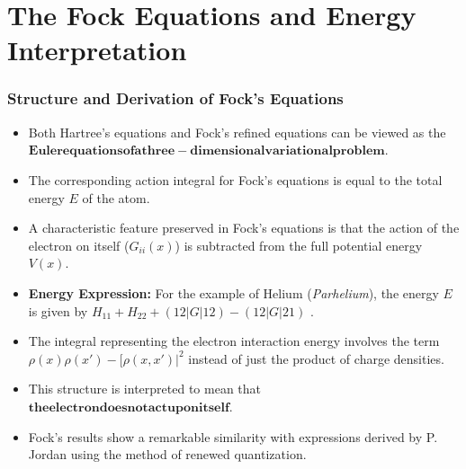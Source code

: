 \section{The Fock Equations and Energy Interpretation}
\begin{frame}
    \frametitle{Structure and Derivation of Fock's Equations}
    \begin{itemize}
        \item Both Hartree's equations  and Fock's refined equations can be viewed as the $\mathbf{Euler equations of a three-dimensional variational problem}$.
        \item The corresponding action integral for Fock's equations is equal to the total energy $E$ of the atom.
        \item A characteristic feature preserved in Fock's equations is that the action of the electron on itself ($G_{ii}(x)$) is subtracted from the full potential energy $V(x)$.
        \item \textbf{Energy Expression:} For the example of Helium (\textit{Parhelium}), the energy $E$ is given by $H_{11} + H_{22} + (12|G|12) - (12|G|21)$ .
        \item The integral representing the electron interaction energy involves the term $\rho(x)\rho(x') - [\rho(x, x')|^2$ instead of just the product of charge densities.
        \item This structure is interpreted to mean that $\mathbf{the electron does not act upon itself}$.
        \item Fock’s results show a remarkable similarity with expressions derived by P. Jordan using the method of renewed quantization.
    \end{itemize}
\end{frame}

